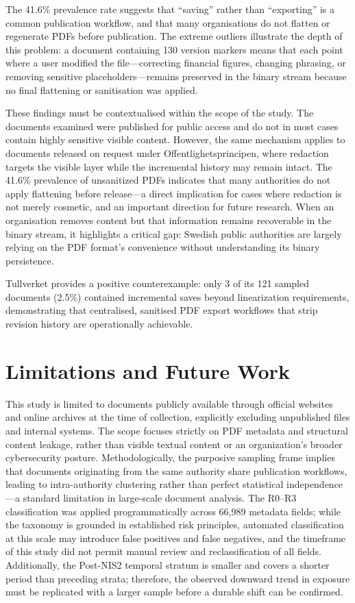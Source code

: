 \documentclass[conference]{IEEEtran}
\begin{document}
The 41.6\% prevalence rate suggests that ``saving'' rather than ``exporting'' is a common publication workflow, and that many organisations do not flatten or regenerate PDFs before publication. The extreme outliers illustrate the depth of this problem: a document containing 130 version markers means that each point where a user modified the file---correcting financial figures, changing phrasing, or removing sensitive placeholders---remains preserved in the binary stream because no final flattening or sanitisation was applied.

These findings must be contextualised within the scope of the study. The documents examined were published for public access and do not in most cases contain highly sensitive visible content. However, the same mechanism applies to documents released on request under Offentlighetsprincipen, where redaction targets the visible layer while the incremental history may remain intact. The 41.6\% prevalence of unsanitized PDFs indicates that many authorities do not apply flattening before release---a direct implication for cases where redaction is not merely cosmetic, and an important direction for future research. When an organisation removes content but that information remains recoverable in the binary stream, it highlights a critical gap: Swedish public authorities are largely relying on the PDF format's convenience without understanding its binary persistence.

Tullverket provides a positive counterexample: only 3 of its 121 sampled documents (2.5\%) contained incremental saves beyond linearization requirements, demonstrating that centralised, sanitised PDF export workflows that strip revision history are operationally achievable.

\section{Limitations and Future Work}
This study is limited to documents publicly available through official websites and online archives at the time of collection, explicitly excluding unpublished files and internal systems. The scope focuses strictly on PDF metadata and structural content leakage, rather than visible textual content or an organization's broader cybersecurity posture. Methodologically, the purposive sampling frame implies that documents originating from the same authority share publication workflows, leading to intra-authority clustering rather than perfect statistical independence---a standard limitation in large-scale document analysis. The R0–R3 classification was applied programmatically across 66,989 metadata fields; while the taxonomy is grounded in established risk principles, automated classification at this scale may introduce false positives and false negatives, and the timeframe of this study did not permit manual review and reclassification of all fields. Additionally, the Post-NIS2 temporal stratum is smaller and covers a shorter period than preceding strata; therefore, the observed downward trend in exposure must be replicated with a larger sample before a durable shift can be confirmed.
\end{document}
